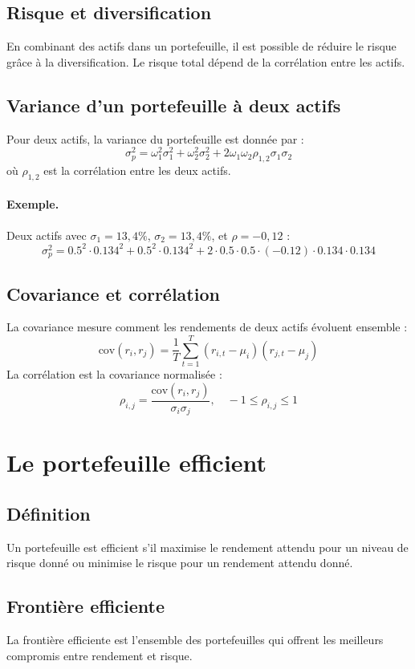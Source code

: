 \documentclass[a4paper, 12pt]{report}
\begin{document}
\subsection{Risque et diversification}
En combinant des actifs dans un portefeuille, il est possible de réduire le risque grâce à la diversification. Le risque total dépend de la corrélation entre les actifs.

\subsection{Variance d’un portefeuille à deux actifs}
Pour deux actifs, la variance du portefeuille est donnée par :
\[
\sigma_p^2 = \omega_1^2 \sigma_1^2 + \omega_2^2 \sigma_2^2 + 2 \omega_1 \omega_2 \rho_{1,2} \sigma_1 \sigma_2
\]
où $\rho_{1,2}$ est la corrélation entre les deux actifs.

\paragraph{Exemple.} 
Deux actifs avec $\sigma_1 = 13,4\%$, $\sigma_2 = 13,4\%$, et $\rho = -0,12$ :
\[
\sigma_p^2 = 0.5^2 \cdot 0.134^2 + 0.5^2 \cdot 0.134^2 + 2 \cdot 0.5 \cdot 0.5 \cdot (-0.12) \cdot 0.134 \cdot 0.134
\]

\subsection{Covariance et corrélation}
La covariance mesure comment les rendements de deux actifs évoluent ensemble :
\[
\text{cov}(r_i, r_j) = \frac{1}{T} \sum_{t=1}^T (r_{i,t} - \mu_i)(r_{j,t} - \mu_j)
\]
La corrélation est la covariance normalisée :
\[
\rho_{i,j} = \frac{\text{cov}(r_i, r_j)}{\sigma_i \sigma_j}, \quad -1 \leq \rho_{i,j} \leq 1
\]

\section{Le portefeuille efficient}

\subsection{Définition}
Un portefeuille est efficient s’il maximise le rendement attendu pour un niveau de risque donné ou minimise le risque pour un rendement attendu donné.

\subsection{Frontière efficiente}
La frontière efficiente est l’ensemble des portefeuilles qui offrent les meilleurs compromis entre rendement et risque.
\end{document}
